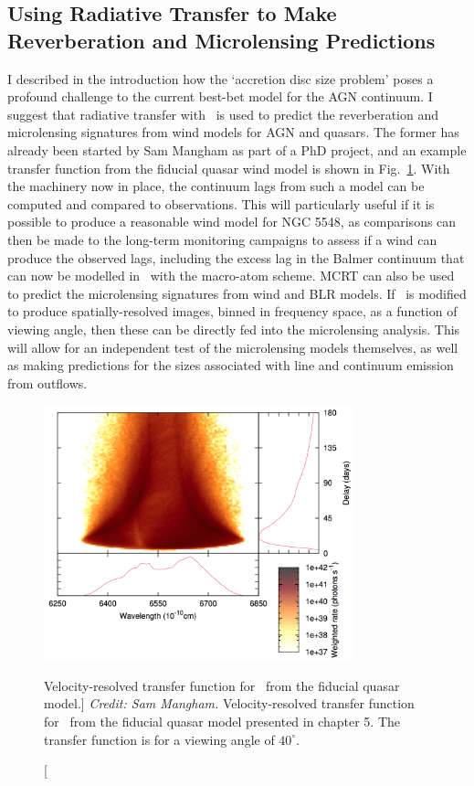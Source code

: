 \subsection{Using Radiative Transfer to Make Reverberation and Microlensing Predictions}

I described in the introduction how the `accretion disc size problem' poses
a profound challenge to the current best-bet model for the AGN continuum.
I suggest that radiative transfer with \py\ is used to predict the 
reverberation and microlensing signatures from wind models for AGN and quasars. 
The former has already been started by Sam Mangham as part of a PhD
project, and an example transfer function from the fiducial quasar wind model
is shown in Fig.~\ref{fig:halpha_transfer}. With the machinery now in place,
the continuum lags from such a model can be computed and compared to observations.
This will particularly useful if it is possible to produce a reasonable wind
model for NGC 5548, as comparisons can then be made to the long-term monitoring
campaigns \citep[e.g.][]{edelson2015} to assess if a wind can produce the observed 
lags, including the excess lag in the Balmer continuum that can now be modelled 
in \py\ with the macro-atom scheme. MCRT can also be used to predict 
the microlensing signatures from wind and BLR models. If \py\ is modified to produce
spatially-resolved images, binned in frequency space, as a function of viewing 
angle, then these can be directly fed into the microlensing analysis. This will
allow for an independent test of the microlensing models themselves, as well as
making predictions for the sizes associated with line and continuum emission from
outflows. 

\begin{figure} 
\centering
\includegraphics[width=0.8\textwidth]{figures/ewpaper/halpha_transfer.png}
\caption
[Velocity-resolved transfer function for \ha\ 
from the fiducial quasar model.]
{
{\sl Credit: Sam Mangham.}
Velocity-resolved transfer function for \ha\ 
from the fiducial quasar model presented in
chapter 5. The transfer function is for a viewing angle of 
$40^\circ$. 
}
\label{fig:halpha_transfer}
\end{figure} 

